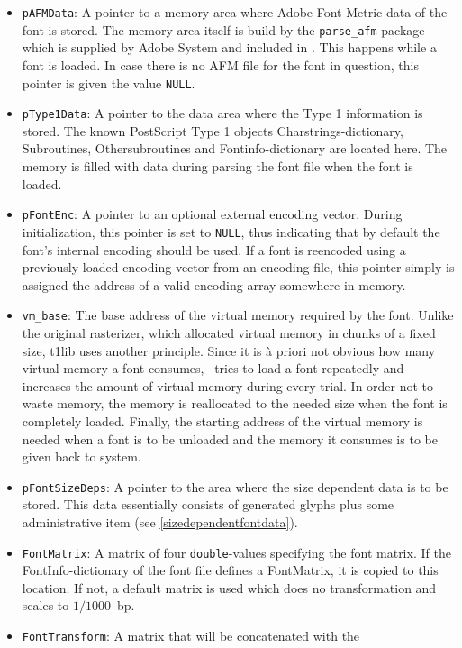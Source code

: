 \begin{itemize}
\item \verb+pAFMData+: A pointer to a memory area where Adobe Font Metric data
  of the font is stored. The memory area itself is build by the
  \verb+parse_afm+-package which is supplied by Adobe System and included in
  \tonelib. This happens while a font is loaded. In case there is no AFM file
  for the font in question, this pointer is given the value \verb+NULL+. 
\item \verb+pType1Data+: A pointer to the data area where the Type 1
  information is stored. The known PostScript Type 1 objects
  Charstrings-dictionary, Subroutines, Othersubroutines and
  Fontinfo-dictionary are located here. The memory is filled with data during
  parsing the font file when the font is loaded.
\item \verb+pFontEnc+: A pointer to an optional external encoding
  vector. During initialization, this pointer is set to \verb+NULL+, thus
  indicating that by default the font's internal encoding should be used.
  If a font is reencoded using a previously loaded encoding vector from an
  encoding file, this pointer simply is assigned the address of a valid
  encoding array somewhere in memory.
\item \verb+vm_base+: The base address of the virtual memory required by the
  font. Unlike the original rasterizer, which allocated virtual memory in
  chunks of a fixed size, t1lib uses another principle. Since it is \`a
  priori not obvious how many virtual memory a font consumes, \tonelib\ tries
  to load a font repeatedly and increases the amount of virtual memory during
  every trial. In order not to waste memory, the memory is reallocated to the
  needed size when the font is completely loaded. Finally, the starting
  address of the virtual memory is needed when a font is to be unloaded and
  the memory it consumes is to be given back to system. 
\item \verb+pFontSizeDeps+: A pointer to the area where the size dependent
  data is to be stored. This data essentially consists of generated glyphs
  plus some administrative item (see \ref{sizedependentfontdata}).
\item \verb+FontMatrix+: A matrix of four \verb+double+-values specifying the
  font matrix. If the FontInfo-dictionary of the font file defines a
  FontMatrix, it is copied to this location. If not, a default matrix is
  used which does no transformation and scales to $1/1000$~bp.
\item \verb+FontTransform+: A matrix that will be concatenated with the

\end{itemize}
